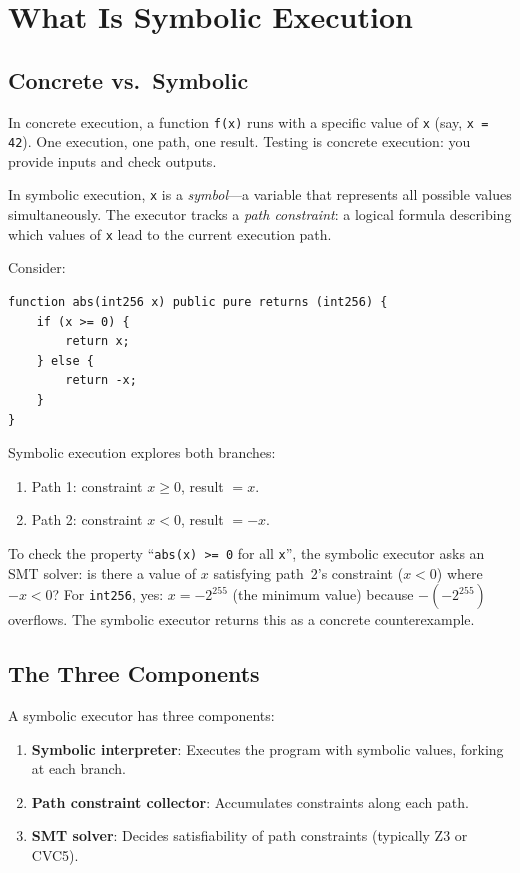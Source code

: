 \section{What Is Symbolic Execution}


\subsection{Concrete vs.\ Symbolic}

In concrete execution, a function \texttt{f(x)} runs with a specific value of \texttt{x}
(say, \texttt{x = 42}). One execution, one path, one result. Testing is concrete
execution: you provide inputs and check outputs.

In symbolic execution, \texttt{x} is a \emph{symbol}---a variable that represents all
possible values simultaneously. The executor tracks a \emph{path constraint}: a logical
formula describing which values of \texttt{x} lead to the current execution path.

Consider:

\begin{lstlisting}[language=Solidity,caption={A simple function with two paths}]
function abs(int256 x) public pure returns (int256) {
    if (x >= 0) {
        return x;
    } else {
        return -x;
    }
}
\end{lstlisting}

Symbolic execution explores both branches:
\begin{enumerate}[nosep]
  \item Path 1: constraint $x \geq 0$, result $= x$.
  \item Path 2: constraint $x < 0$, result $= -x$.
\end{enumerate}

To check the property ``\texttt{abs(x) >= 0} for all \texttt{x}'', the symbolic executor
asks an SMT solver: is there a value of $x$ satisfying path~2's constraint ($x < 0$)
where $-x < 0$? For \texttt{int256}, yes: $x = -2^{255}$ (the minimum value) because
$-(-2^{255})$ overflows. The symbolic executor returns this as a concrete counterexample.

\subsection{The Three Components}

A symbolic executor has three components:

\begin{enumerate}
  \item \textbf{Symbolic interpreter}: Executes the program with symbolic values, forking
    at each branch.
  \item \textbf{Path constraint collector}: Accumulates constraints along each path.
  \item \textbf{SMT solver}: Decides satisfiability of path constraints (typically Z3 or
    CVC5).
\end{enumerate}

